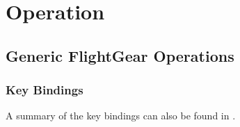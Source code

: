 \documentclass[a4paper]{report}
\newcommand{\AJSonly}[1]{\ifbool{AJS}{#1}{}}
\begin{document}



\part{Operation}
\chapter{Generic FlightGear Operations}
\section{Key Bindings}
A summary of the key bindings can also be found in .
\end{document}
